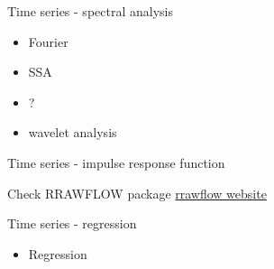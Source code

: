 \documentclass[8pt,ignorenonframetext,]{beamer}
\providecommand{\tightlist}{%
  \setlength{\itemsep}{0pt}\setlength{\parskip}{0pt}}
\begin{document}
\begin{frame}{Time series - spectral analysis}

\begin{itemize}
\tightlist
\item
  Fourier
\item
  SSA
\item
  ?
\item
  wavelet analysis
\end{itemize}

\end{frame}

\begin{frame}{Time series - impulse response function}

Check RRAWFLOW package
\href{https://sd.water.usgs.gov/projects/RRAWFLOW/RRAWFLOW.html}{rrawflow
website}

\end{frame}

\begin{frame}{Time series - regression}

\begin{itemize}
\tightlist
\item
  Regression
\end{itemize}

\end{frame}
\end{document}
